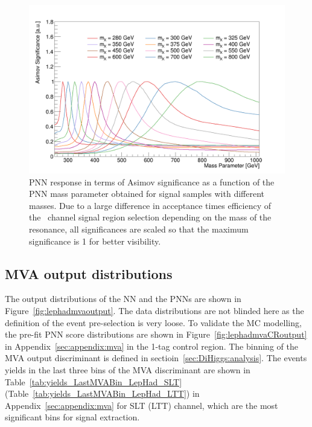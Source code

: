 \begin{figure}[htbp]
\centering
\includegraphics[width=0.85\linewidth]{DiHiggs/plots/mass_response.png}
\caption{
    PNN response in terms of Asimov significance as a function of the PNN mass parameter obtained for
signal samples with different masses. Due to a large difference in acceptance times
efficiency of the \lephad\ channel signal region selection depending on the mass of the resonance, 
all significances are scaled so that the maximum significance is 1 for better visibility.}
\label{fig:MVA:mass-response}
\end{figure}



\subsection{MVA output distributions}
The output distributions of the NN and the PNNs are shown in 
Figure~\ref{fig:lephadmvaoutput}. 
The data distributions are not blinded here as the definition of the event
pre-selection is very loose. 
To validate the MC modelling, the pre-fit PNN score distributions are shown in 
Figure~\ref{fig:lephadmvaCRoutput} in Appendix~\ref{sec:appendix:mva} in the 1-tag control region. 
The binning of the MVA output discriminant is defined in sectioin~\ref{sec:DiHiggs:analysis}.
The events yields in the last three bins of the MVA discriminant are shown in 
Table~\ref{tab:yields_LastMVABin_LepHad_SLT} (Table~\ref{tab:yields_LastMVABin_LepHad_LTT}) 
in Appendix~\ref{sec:appendix:mva} for SLT (LTT) channel, which are the most significant bins
for signal extraction. 



